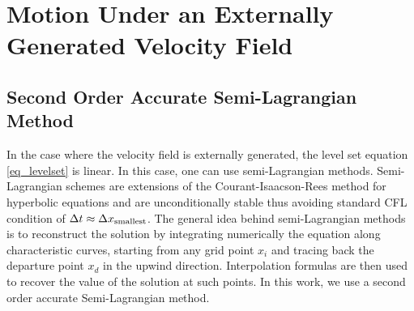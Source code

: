 \documentclass[english]{article}
\begin{document}
%
%
%
%
\section{Motion Under an Externally Generated Velocity Field}\label{sec_semi_lagrangian}
\subsection{Second Order Accurate Semi-Lagrangian Method\label{Sec_midpoint_rule}}
In the case where the velocity field is externally generated, the level set
equation \eqref{eq_levelset} is linear. In this case, one can use
semi-Lagrangian methods. Semi-Lagrangian schemes are extensions of the
Courant-Isaacson-Rees \cite{Courant:1952:CIR_Method} method for hyperbolic
equations and are unconditionally stable thus avoiding standard CFL
condition of $\Delta t \approx \Delta x_{\rm smallest}$. The general idea
behind semi-Lagrangian methods is to reconstruct the solution by
integrating numerically the equation along characteristic curves, starting
from any grid point $x_i$ and tracing back the departure point $x_d$ in the
upwind direction. Interpolation formulas are then used to recover the value
of the solution at such points. In this work, we use a second order
accurate Semi-Lagrangian method.
\end{document}
